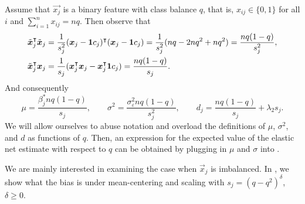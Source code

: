 Assume that \(\vec{x_j}\) is a binary feature with class balance \(q\), that is, \(x_{ij} \in \{0, 1\}\) for all \(i\) and \(\sum_{i=1}^n x_{ij} = nq\). Then observe that
\[
  \begin{aligned}
    \tilde{\boldsymbol{x}}_j^\intercal \tilde{\boldsymbol{x}}_j & = \frac{1}{s_j^2}(\boldsymbol{x}_j - \boldsymbol{1} c_j)^\intercal (\boldsymbol{x}_j - \boldsymbol{1} c_j) = \frac{1}{s^2_j}(nq - 2nq^2 + nq^2) = \frac{nq(1-q)}{s^2_j}, \\
    \tilde{\boldsymbol{x}}_j^\intercal \boldsymbol{x}_j         & = \frac{1}{s_j}(\boldsymbol{x}_j^\intercal \boldsymbol{x}_j - \boldsymbol{x}_j^\intercal \boldsymbol{1} c_j) = \frac{nq(1 - q)}{s_j}.
  \end{aligned}
\]
And consequently
\[
  \mu = \frac{\beta^*_j nq(1 - q)}{s_j}, \qquad \sigma^2 = \frac{\sigma_\varepsilon^2nq(1 - q)}{s^2_j}, \qquad d_j = \frac{nq(1 -q)}{s_j}  + \lambda_2 s_j.
\]
We will allow ourselves to abuse notation and overload the definitions of \(\mu\), \(\sigma^2\), and \(d\) as functions of \(q\). Then, an expression for the expected value of the elastic net estimate with respect to \(q\) can be obtained by plugging in \(\mu\) and \(\sigma\) into .

We are mainly interested in examining the case when \(\vec{x}_j\) is imbalanced. In , we show what the
bias is under mean-centering and scaling with \(s_j = (q - q^2)^\delta\), \(\delta \geq 0\).

